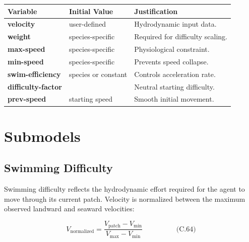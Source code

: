 \documentclass[
]{book}
\begin{document}
\begin{longtable}[]{@{}
  >{\centering\arraybackslash}p{}
  >{\centering\arraybackslash}p{}
  >{\centering\arraybackslash}p{}@{}}
\toprule\noalign{}
\begin{minipage}[b]{\linewidth}\centering
Variable
\end{minipage} & \begin{minipage}[b]{\linewidth}\centering
Initial Value
\end{minipage} & \begin{minipage}[b]{\linewidth}\centering
Justification
\end{minipage} \\
\midrule\noalign{}
\endhead
\bottomrule\noalign{}
\endlastfoot
\textbf{velocity} & user-defined & Hydrodynamic input data. \\
\textbf{weight} & species-specific & Required for difficulty scaling. \\
\textbf{max-speed} & species-specific & Physiological constraint. \\
\textbf{min-speed} & species-specific & Prevents speed collapse. \\
\textbf{swim-efficiency} & species or constant & Controls acceleration rate. \\
\textbf{difficulty-factor} & 1 & Neutral starting difficulty. \\
\textbf{prev-speed} & starting speed & Smooth initial movement. \\
\end{longtable}

\section{Submodels}\label{submodels-6}

\subsection{Swimming Difficulty}\label{swimming-difficulty}

Swimming difficulty reflects the hydrodynamic effort required for the
agent to move through its current patch. Velocity is normalized between
the maximum observed landward and seaward velocities:

\[
\begin{equation} V_{\text{normalized}} = \frac{V_{\text{patch}} - V_{\min}}{V_{\max} - V_{\min}}  \hspace{2cm} \text{(C.64)} \end{equation}
\]
\end{document}
